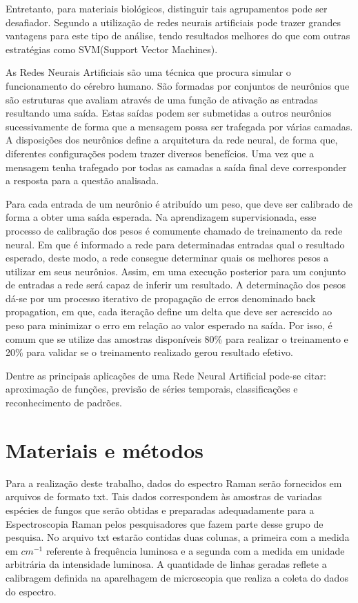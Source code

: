 \documentclass[conference,peerreview]{IEEEtran}
\begin{document}
Entretanto, para materiais biológicos, distinguir tais agrupamentos pode ser desafiador. Segundo \cite{Seifert2016} a utilização de redes neurais artificiais pode trazer grandes vantagens para este tipo de análise, tendo resultados melhores do que com outras estratégias como SVM(Support Vector Machines).

As Redes Neurais Artificiais são uma técnica que procura simular o funcionamento do cérebro humano. São formadas por conjuntos de neurônios que são estruturas que avaliam através de uma função de ativação as entradas resultando uma saída. Estas saídas podem ser submetidas a outros neurônios sucessivamente de forma que a mensagem possa ser trafegada por várias camadas. A disposições dos neurônios define a arquitetura da rede neural, de forma que, diferentes configurações podem trazer diversos benefícios. Uma vez que a mensagem tenha trafegado por todas as camadas a saída final deve corresponder a resposta para a questão analisada.

Para cada entrada de um neurônio é atribuído um peso, que deve ser calibrado de forma a obter uma saída esperada. Na aprendizagem supervisionada, esse processo de calibração dos pesos é comumente chamado de treinamento da rede neural. Em que é informado a rede para determinadas entradas qual o resultado esperado, deste modo, a rede consegue determinar quais os melhores pesos a utilizar em seus neurônios. Assim, em uma execução posterior para um conjunto de entradas a rede será capaz de inferir um resultado. A determinação dos pesos dá-se por um processo iterativo de propagação de erros denominado back propagation, em que, cada iteração define um delta que deve ser acrescido ao peso para minimizar o erro em relação ao valor esperado na saída. Por isso, é comum que se utilize das amostras disponíveis 80\% para realizar o treinamento e 20\% para validar se o treinamento realizado gerou resultado efetivo. 

Dentre as principais aplicações de uma Rede Neural Artificial pode-se citar: aproximação de funções, previsão de séries temporais, classificações e reconhecimento de padrões.

\section{Materiais e métodos}

Para a realização deste trabalho, dados do espectro Raman serão fornecidos em arquivos de formato txt. Tais dados correspondem às amostras de variadas espécies de fungos que serão obtidas e preparadas adequadamente para a Espectroscopia Raman pelos pesquisadores que fazem parte desse grupo de pesquisa. No arquivo txt estarão contidas duas colunas, a primeira com a medida em $cm^{-1}$ referente à frequência luminosa e a segunda com a medida em unidade arbitrária da intensidade luminosa. A quantidade de linhas geradas reflete a calibragem definida na aparelhagem de microscopia que realiza a coleta do dados do espectro.
\end{document}
